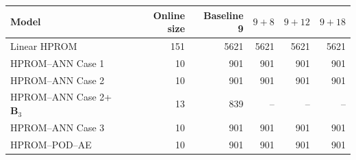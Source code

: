 \begin{tabular}{lr|r|r|r|r}
\toprule
Model & Online size & Baseline 9 & $9+8$ & $9+12$ & $9+18$ \\
\midrule
Linear HPROM & 151 & 5621 & 5621 & 5621 & 5621 \\
HPROM--ANN Case 1 & 10 & 901 & 901 & 901 & 901 \\
HPROM--ANN Case 2 & 10 & 901 & 901 & 901 & 901 \\
HPROM--ANN Case 2+$\mathbf B_3$ & 13 & 839 & -- & -- & -- \\
HPROM--ANN Case 3 & 10 & 901 & 901 & 901 & 901 \\
HPROM--POD--AE & 10 & 901 & 901 & 901 & 901 \\
\bottomrule
\end{tabular}
